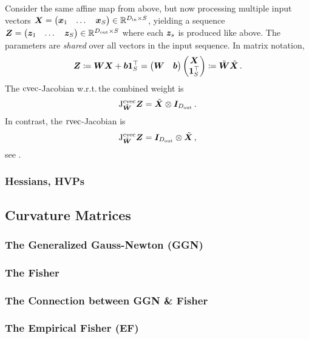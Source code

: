 \begin{paracol}{2}
  \begin{example}
    Consider the same affine map from above, but now processing multiple input vectors ${\bm{X}} = \begin{pmatrix}{\bm{x}}_1 & \dots & {\bm{x}}_S\end{pmatrix} \in {\mathbb{R}}^{D_{\text{in}}\times S}$, yielding a sequence ${\bm{Z}} = \begin{pmatrix} {\bm{z}}_1 & \dots & {\bm{z}}_S\end{pmatrix} \in {\mathbb{R}}^{D_{\text{out}}\times S}$ where each ${\bm{z}}_s$ is produced like above.
    The parameters are \emph{shared} over all vectors in the input sequence.
    In matrix notation,
    \begin{align*}
      {\bm{Z}}
      \coloneqq
      {\bm{W}} {\bm{X}} + {\bm{b}} {\bm{1}}^{\top}_S
      =
      \begin{pmatrix}
        {\bm{W}} & {\bm{b}}
      \end{pmatrix}
      \begin{pmatrix}
        {\bm{X}} \\ {\bm{1}}^{\top}_S
      \end{pmatrix}
      \coloneqq
      \tilde{{\bm{W}}}
      \tilde{{\bm{X}}}\,.
    \end{align*}
    The $\operatorname{cvec}$-Jacobian w.r.t.\,the combined weight is
    \begin{align*}
      \mathrm{J}^{\operatorname{cvec}}_{\tilde{{\bm{W}}}}{\bm{Z}}
      =
      \tilde{{\bm{X}}}
      \otimes
      {\bm{I}}_{D_{\text{out}}}\,.
    \end{align*}
    In contrast, the $\operatorname{rvec}$-Jacobian is
    \begin{align*}
      \mathrm{J}^{\operatorname{cvec}}_{\tilde{{\bm{W}}}}{\bm{Z}}
      =
      {\bm{I}}_{D_{\text{out}}}
      \otimes
      \tilde{{\bm{X}}}\,,
    \end{align*}
    see .
  \end{example}

  \switchcolumn[1]

\end{paracol}
\subsubsection{Hessians, HVPs}

\subsection{Curvature Matrices}
\subsubsection{The Generalized Gauss-Newton (GGN)}
\subsubsection{The Fisher}
\subsubsection{The Connection between GGN \& Fisher}
\subsubsection{The Empirical Fisher (EF)}

